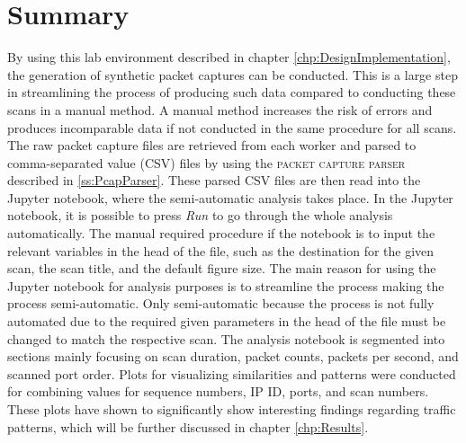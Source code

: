 \section{Summary}
\label{s:DataGASummary}

By using this lab environment described in chapter \ref{chp:DesignImplementation}, the generation of synthetic packet captures can be conducted.
This is a large step in streamlining the process of producing such data compared to conducting these scans in a manual method. A manual method increases the risk of errors and produces incomparable data if not conducted in the same procedure for all scans.
The raw packet capture files are retrieved from each worker and parsed to comma-separated value (CSV) files by using the \textsc{packet capture parser} described in \ref{ss:PcapParser}.
These parsed CSV files are then read into the Jupyter notebook, where the semi-automatic analysis takes place.
In the Jupyter notebook, it is possible to press \textit{Run} to go through the whole analysis automatically. The manual required procedure if the notebook is to input the relevant variables in the head of the file, such as the destination for the given scan, the scan title, and the default figure size.
The main reason for using the Jupyter notebook for analysis purposes is to streamline the process making the process semi-automatic. Only semi-automatic because the process is not fully automated due to the required given parameters in the head of the file must be changed to match the respective scan.
The analysis notebook is segmented into sections mainly focusing on scan duration, packet counts, packets per second, and scanned port order.
Plots for visualizing similarities and patterns were conducted for combining values for sequence numbers, IP ID, ports, and scan numbers.
These plots have shown to significantly show interesting findings regarding traffic patterns, which will be further discussed in chapter \ref{chp:Results}.


